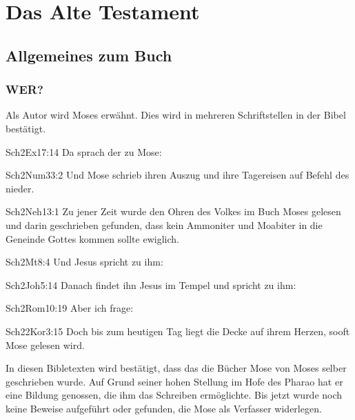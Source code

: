 \chapter{Das Alte Testament}
\section{Allgemeines zum Buch}
\subsection{WER?}
Als Autor wird Moses erwähnt. Dies wird in mehreren Schriftstellen in der Bibel bestätigt.
\begin{bibeltext}{Sch2}{Ex}{17:14}
	Da sprach der \herr{} zu Mose: 
\end{bibeltext}
\begin{bibeltext}{Sch2}{Num}{33:2}
    Und Mose schrieb ihren Auszug und ihre Tagereisen auf Befehl des \herr{} nieder.
\end{bibeltext}
\begin{bibeltext}{Sch2}{Neh}{13:1}
    Zu jener Zeit wurde den Ohren des Volkes im Buch Moses gelesen und darin geschrieben gefunden, dass kein Ammoniter und Moabiter in die Geneinde Gottes kommen sollte ewiglich.
\end{bibeltext}
\begin{bibeltext}{Sch2}{Mt}{8:4}
    Und Jesus spricht zu ihm: 
\end{bibeltext}
\begin{bibeltext}{Sch2}{Joh}{5:14}
    Danach findet ihn Jesus im Tempel und spricht zu ihm: 
\end{bibeltext}
\begin{bibeltext}{Sch2}{Rom}{10:19}
    Aber ich frage: 
\end{bibeltext}
\begin{bibeltext}{Sch2}{2Kor}{3:15}
   Doch bis zum heutigen Tag liegt die Decke auf ihrem Herzen, sooft Mose gelesen wird. 
\end{bibeltext}
In diesen Bibletexten wird bestätigt, dass das die Bücher Mose von Moses selber geschrieben wurde. Auf Grund seiner hohen Stellung im Hofe des Pharao hat er eine Bildung genossen, die ihm das Schreiben ermöglichte. Bis jetzt wurde noch keine Beweise aufgeführt oder gefunden, die Mose als Verfasser widerlegen.
